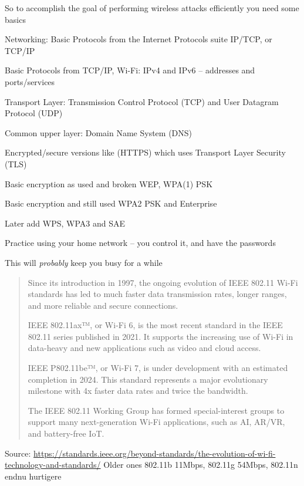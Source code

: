 \documentclass[Screen16to9,17pt]{foils}
\begin{document}



So to accomplish the goal of performing wireless attacks efficiently you need some basics

Networking: Basic Protocols from the Internet Protocols suite IP/TCP, or TCP/IP
\begin{list2}
\item Basic Protocols from TCP/IP, Wi-Fi: IPv4 and IPv6 -- addresses and ports/services
\item Transport Layer: Transmission Control Protocol (TCP) and User Datagram Protocol (UDP)
\item Common upper layer: Domain Name System (DNS)
\item Encrypted/secure versions like (HTTPS) which uses Transport Layer Security (TLS)
\item Basic encryption as used and broken WEP, WPA(1) PSK
\item Basic encryption and still used WPA2 PSK and Enterprise
\item Later add WPS, WPA3 and SAE
\item Practice using your home network -- you control it, and have the passwords
\end{list2}

This will \emph{probably} keep you busy for a while \smiley


\begin{quote}
\begin{list2}
\item Since its introduction in 1997, the ongoing evolution of IEEE 802.11 Wi-Fi standards has led to much faster data transmission rates, longer ranges, and more reliable and secure connections.
\item IEEE 802.11ax™, or Wi-Fi 6, is the most recent standard in the IEEE 802.11 series published in 2021. It supports the increasing use of Wi-Fi in data-heavy and new applications such as video and cloud access.
\item IEEE P802.11be™, or Wi-Fi 7, is under development with an estimated completion in 2024. This standard represents a major evolutionary milestone with 4x faster data rates and twice the bandwidth.
\item The IEEE 802.11 Working Group has formed special-interest groups to support many next-generation Wi-Fi applications, such as AI, AR/VR, and battery-free IoT.
\end{list2}
\end{quote}
Source: \url{https://standards.ieee.org/beyond-standards/the-evolution-of-wi-fi-technology-and-standards/}
Older ones 802.11b 11Mbps, 802.11g 54Mbps, 802.11n endnu hurtigere
\end{document}
